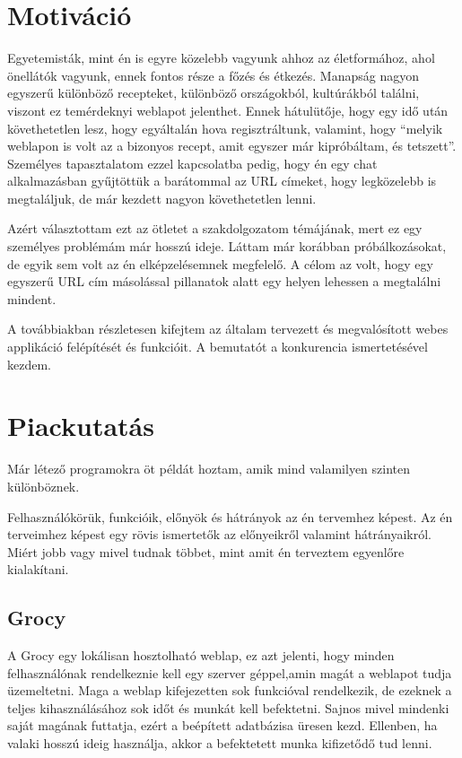 \documentclass[12pt]{report}
\theoremstyle{definition}
\begin{document}
\chapter*{Motiváció}

Egyetemisták, mint én is egyre közelebb vagyunk ahhoz az életformához, ahol önellátók vagyunk, ennek fontos része a főzés és étkezés. Manapság nagyon egyszerű különböző recepteket, különböző országokból, kultúrákból találni, viszont ez temérdeknyi weblapot jelenthet. Ennek hátulütője, hogy egy idő után követhetetlen lesz, hogy egyáltalán hova regisztráltunk, valamint, hogy “melyik weblapon is volt az a bizonyos recept, amit egyszer már kipróbáltam, és tetszett”. Személyes tapasztalatom ezzel kapcsolatba pedig, hogy én egy chat alkalmazásban gyűjtöttük a barátommal az URL címeket, hogy legközelebb is megtaláljuk, de már kezdett nagyon követhetetlen lenni.

Azért választottam ezt az ötletet a szakdolgozatom témájának, mert ez egy személyes problémám már hosszú ideje. Láttam már korábban próbálkozásokat, de egyik sem volt az én elképzelésemnek megfelelő. A célom az volt, hogy egy egyszerű URL cím másolással pillanatok alatt egy helyen lehessen a megtalálni mindent. 

A továbbiakban részletesen kifejtem az általam tervezett és megvalósított webes applikáció felépítését és funkcióit. A bemutatót a konkurencia ismertetésével kezdem.



\chapter{Piackutatás}
Már létező programokra öt példát hoztam, amik mind valamilyen szinten különböznek.

Felhasználókörük, funkcióik, előnyök és hátrányok az én tervemhez képest. Az én terveimhez képest egy rövis ismertetők az előnyeikről valamint hátrányaikról. Miért jobb vagy mivel tudnak többet, mint amit én terveztem egyenlőre kialakítani.


\section{Grocy}
A Grocy egy lokálisan hosztolható weblap, ez azt jelenti, hogy minden felhasználónak rendelkeznie kell egy szerver géppel,amin magát a weblapot tudja üzemeltetni. Maga a weblap kifejezetten sok funkcióval rendelkezik, de ezeknek a teljes kihasználásához sok időt és munkát kell befektetni. Sajnos mivel mindenki saját magának futtatja, ezért a beépített adatbázisa üresen kezd. Ellenben, ha valaki hosszú ideig használja, akkor a befektetett munka kifizetődő tud lenni. 
\end{document}
